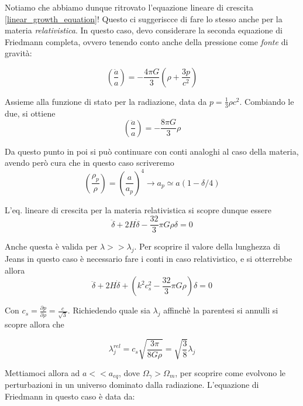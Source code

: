 \documentclass{report}
\begin{document}
Notiamo che abbiamo dunque ritrovato l'equazione lineare di crescita \ref{linear_growth_equation}! Questo ci suggeriscce di fare lo stesso anche per la materia \emph{relativistica}. In questo caso, devo considerare la seconda equazione di Friedmann completa, ovvero tenendo conto anche della pressione come \emph{fonte} di gravità: 

\begin{equation}
    \left(\frac{\ddot{a}}{a} \right) = -\frac{4\pi G}{3}\left(\rho + \frac{3p}{c^2} \right)
\end{equation}

Assieme alla funzione di stato per la radiazione, data da $p = \frac{1}{3}\rho c^2$. Combiando le due, si ottiene 
\begin{equation}
    \left(\frac{\ddot{a}}{a} \right) = -\frac{8\pi G}{3}\rho
\end{equation}

Da questo punto in poi si può continuare con conti analoghi al caso della materia, avendo però cura che in questo caso scriveremo
\begin{equation}
    \left(\frac{\rho_p}{\rho} \right) = \left(\frac{a}{a_p} \right)^4 \rightarrow a_p \simeq a(1 - \delta/4)
\end{equation}

L'eq. lineare di crescita per la materia relativistica si scopre dunque essere
\begin{equation}
    \ddot{\delta} + 2H\dot{\delta} - \frac{32}{3}\pi G \rho \delta = 0 
\end{equation}

Anche questa è valida per $\lambda >> \lambda_j$. Per scoprire il valore della lunghezza di Jeans in questo caso è necessario fare i conti in caso relativistico, e si otterrebbe allora 
\begin{equation}
    \ddot{\delta} + 2H\dot{\delta} + \left(k^2c_s^2 -\frac{32}{3}\pi G \rho\right) \delta = 0 
\end{equation}

Con $c_s = \frac{\partial p}{\partial \rho} = \frac{c}{\sqrt{3}}$. Richiedendo quale sia $\lambda_j$ affinchè la parentesi si annulli si scopre allora che 

\begin{equation}
    \lambda_j^{rel} = c_s\sqrt{\frac{3\pi}{8G\rho}} = \sqrt{\frac{3}{8}}\lambda_j
\end{equation}

Mettiamoci allora ad $a << a_{eq}$, dove $\Omega_\gamma > \Omega_m$, per scoprire come evolvono le perturbazioni in un universo dominato dalla radiazione. L'equazione di Friedmann in questo caso è data da: 
\end{document}
